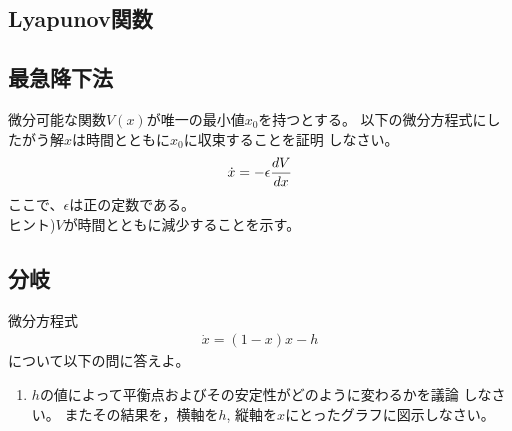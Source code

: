 \documentclass[twocolumn,11pt]{jarticle}
\begin{document}
\subsection{Lyapunov関数}

\subsection{最急降下法}
微分可能な関数$V(x)$が唯一の最小値$x_0$を持つとする。
以下の微分方程式にしたがう解$x$は時間とともに$x_0$に収束することを証明
しなさい。
\begin{align}
  \dot{x}=-\epsilon\frac{d V}{d x}\notag
\end{align}
ここで、$\epsilon$は正の定数である。\\
ヒント)$V$が時間とともに減少することを示す。

\subsection{分岐}
\question
微分方程式
\begin{align}
  \label{eq:logistic-h}
  \dot{x}=(1-x)x-h
\end{align}
について以下の問に答えよ。
\begin{enumerate}
\item $h$の値によって平衡点およびその安定性がどのように変わるかを議論
  しなさい。
  またその結果を，横軸を$h$, 縦軸を$x$にとったグラフに図示しなさい。
\end{enumerate}
\end{document}

